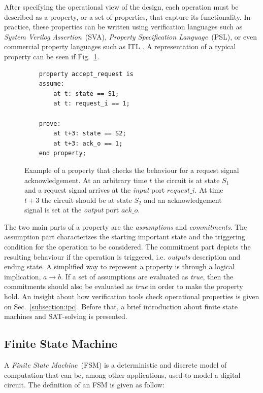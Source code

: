 After specifying the operational view of the design, each operation must be described as a property, or a set of properties, that capture its functionality. In practice, these properties can be written using verification languages such as \textit{System Verilog Assertion}~(SVA), \textit{Property Specification Language}~(PSL), or even commercial property languages such as ITL \cite{onespin}. A representation of a typical property can be seen if Fig.~\ref{fig:property}.

\begin{figure}[htb!]
    \begin{lstlisting}
    property accept_request is
    assume:
        at t: state == S1;
        at t: request_i == 1;
    
    prove:
        at t+3: state == S2;
        at t+3: ack_o == 1;
    end property;\end{lstlisting}
    \caption{Example of a property that checks the behaviour for a request signal acknowledgement. At an arbitrary time $t$ the circuit is at state $S_1$ and a request signal arrives at the \textit{input} port $request\_i$. At time $t+3$ the circuit should be at state $S_2$ and an acknowledgement signal is set at the \textit{output} port $ack\_o$.}
    \label{fig:property}
\end{figure}

The two main parts of a property are the \textit{assumptions} and \textit{commitments}. The assumption part characterizes the starting important state and the triggering condition for the operation to be considered. The commitment part depicts the resulting behaviour if the operation is triggered, i.e. \textit{outputs} description and ending state. A simplified way to represent a property is through a logical implication, $a \longrightarrow b$. If a set of assumptions are evaluated as \textit{true}, then the commitments should also be evaluated as \textit{true} in order to make the property hold. An insight about how verification tools check operational properties is given on Sec.~\ref{subsection:ipc}. Before that, a brief introduction about finite state machines and SAT-solving is presented.

\subsection*{Finite State Machine}

A \textit{Finite State Machine}~(FSM) is a deterministic and discrete model of computation that can be, among other applications, used to model a digital circuit. The definition of an FSM is given as follow:

